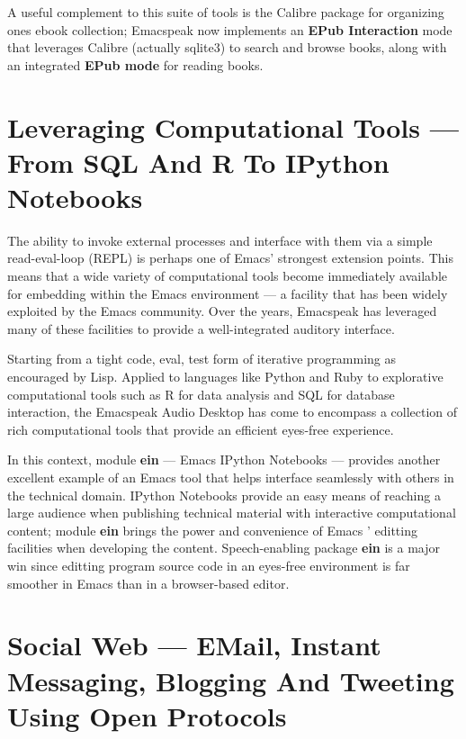 \documentclass[11pt]{article}
\begin{document}
A useful complement to this suite of tools is the Calibre package
for organizing ones ebook collection; Emacspeak now implements an
\textbf{EPub Interaction} mode that leverages Calibre (actually sqlite3)
to search and browse books, along with an integrated \textbf{EPub mode}
for reading books.

\section{Leveraging Computational Tools —  From SQL And R To IPython Notebooks}
\label{sec-12}

The ability to invoke external processes and interface with them
via a simple read-eval-loop (REPL) is perhaps one of Emacs'
strongest extension points. This means that a wide variety of
computational tools become immediately available for embedding
within the Emacs environment — a facility that has been widely
exploited by the Emacs community. Over the years, Emacspeak has
leveraged many of these facilities to provide a well-integrated
auditory interface.

Starting from a tight code, eval, test form of iterative
programming as encouraged by Lisp. Applied to languages like
Python and Ruby to explorative computational tools such as R for
data analysis and SQL for database interaction, the Emacspeak
Audio Desktop has come to encompass a collection of rich
computational tools that provide an efficient eyes-free
experience.


In this context, module \textbf{ein} — Emacs IPython Notebooks —
provides another excellent example of an Emacs tool that helps
interface seamlessly with others in the technical domain. IPython
Notebooks provide an easy means of reaching a large audience when
publishing technical material with interactive computational
content; module \textbf{ein} brings the power and convenience of Emacs '
editting facilities when developing the content. Speech-enabling
package \textbf{ein} is a major win since editting program source code
in an eyes-free environment is far smoother in Emacs than in a
browser-based editor.

\section{Social Web  — EMail, Instant Messaging, Blogging  And Tweeting Using Open Protocols}
\label{sec-13}
\end{document}
